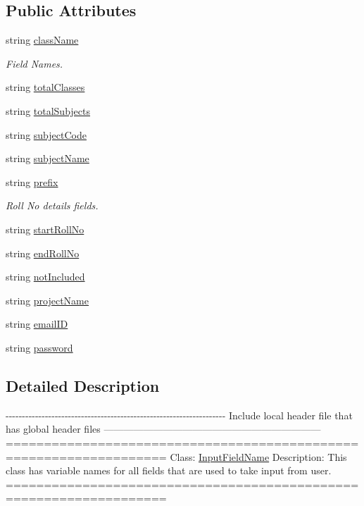 \subsection*{Public Attributes}
\begin{DoxyCompactItemize}
\item 
string \hyperlink{classInputFieldName_ad8b28ebeabdabb5967542e317f549280}{class\-Name}
\begin{DoxyCompactList}\small\item\em Field Names. \end{DoxyCompactList}\item 
string \hyperlink{classInputFieldName_a5bf413dee6dcf29c1872e93f150d48c0}{total\-Classes}
\item 
string \hyperlink{classInputFieldName_ac58130077f39d82aaf447b1a67e9f70f}{total\-Subjects}
\item 
string \hyperlink{classInputFieldName_af1cc6871c33344c365e6e25ea482bd48}{subject\-Code}
\item 
string \hyperlink{classInputFieldName_a0614731b959afef6bb00f9fc957e7521}{subject\-Name}
\item 
string \hyperlink{classInputFieldName_a161d155f8faca2c5dea1bbd607b17553}{prefix}
\begin{DoxyCompactList}\small\item\em Roll No details fields. \end{DoxyCompactList}\item 
string \hyperlink{classInputFieldName_a24baf5c915b4ee0fb8678e03adec043a}{start\-Roll\-No}
\item 
string \hyperlink{classInputFieldName_a06435f9ba5a529cbba4ee1ce9b02e5cc}{end\-Roll\-No}
\item 
string \hyperlink{classInputFieldName_a9ee6ee84737e1199bdfd9fb24c82c2c7}{not\-Included}
\item 
string \hyperlink{classInputFieldName_ab93b034743570810afe89aea88a7bbf6}{project\-Name}
\item 
string \hyperlink{classInputFieldName_a05541618feaaebe7a3f74b0bf8fa74b9}{email\-I\-D}
\item 
string \hyperlink{classInputFieldName_a318f819ef4663d7e5f40d91180093cb9}{password}
\end{DoxyCompactItemize}


\subsection{Detailed Description}
-\/-\/-\/-\/-\/-\/-\/-\/-\/-\/-\/-\/-\/-\/-\/-\/-\/-\/-\/-\/-\/-\/-\/-\/-\/-\/-\/-\/-\/-\/-\/-\/-\/-\/-\/-\/-\/-\/-\/-\/-\/-\/-\/-\/-\/-\/-\/-\/-\/-\/-\/-\/-\/-\/-\/-\/-\/-\/-\/-\/-\/-\/-\/-\/-\/-\/-\/ Include local header file that has global header files ------------------------------------------------------------------ =================================================================== Class\-: \hyperlink{classInputFieldName}{Input\-Field\-Name} Description\-: This class has variable names for all fields that are used to take input from user. =================================================================== 

